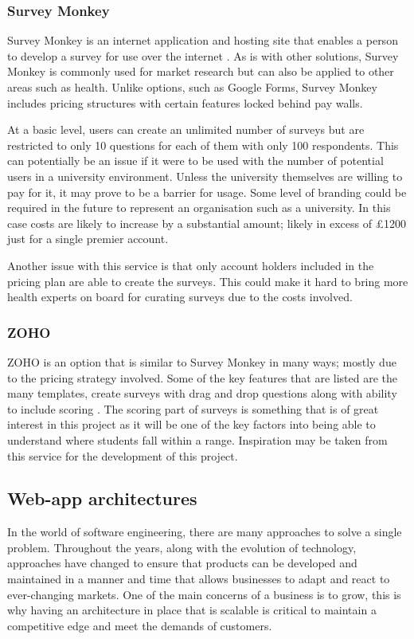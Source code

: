 \subsubsection{Survey Monkey}
Survey Monkey is an internet application and hosting site that enables a person to develop a survey for use over the internet \cite{waclawski2012use}.
As is with other solutions, Survey Monkey is commonly used for market research but can also be applied to other areas such as health.
Unlike options, such as Google Forms, Survey Monkey includes pricing structures with certain features locked behind pay walls.

At a basic level, users can create an unlimited number of surveys but are restricted to only 10 questions for each of them with only 100 respondents.
This can potentially be an issue if it were to be used with the number of potential users in a university environment. 
Unless the university themselves are willing to pay for it, it may prove to be a barrier for usage.
Some level of branding could be required in the future to represent an organisation such as a university.
In this case costs are likely to increase by a substantial amount; likely in excess of £1200 just for a single premier account.

Another issue with this service is that only account holders included in the pricing plan are able to create the surveys.
This could make it hard to bring more health experts on board for curating surveys due to the costs involved.

\subsubsection{ZOHO}
ZOHO is an option that is similar to Survey Monkey in many ways; mostly due to the pricing strategy involved.
Some of the key features that are listed are the many templates, create surveys with drag and drop questions along with ability to include scoring \cite{zoho2018features}.
The scoring part of surveys is something that is of great interest in this project as it will be one of the key factors into being able to understand 
where students fall within a range.
Inspiration may be taken from this service for the development of this project.

\subsection{Web-app architectures}
In the world of software engineering, there are many approaches to solve a single problem.
Throughout the years, along with the evolution of technology, approaches have changed to ensure that products can be developed and maintained in a 
manner and time that allows businesses to adapt and react to ever-changing markets. 
One of the main concerns of a business is to grow, this is why having an architecture in place that is scalable is critical to maintain a competitive 
edge and meet the demands of customers.

